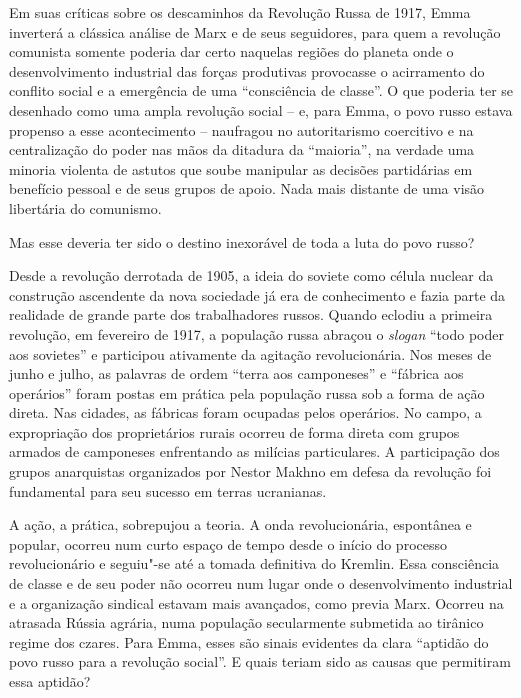 Em suas críticas sobre os descaminhos da Revolução Russa de 1917, Emma
inverterá a clássica análise de Marx e de seus seguidores, para quem a
revolução comunista somente poderia dar certo naquelas regiões do
planeta onde o desenvolvimento industrial das forças produtivas
provocasse o acirramento do conflito social e a emergência de uma
“consciência de classe”. O que poderia ter se desenhado como uma ampla
revolução social – e, para Emma, o povo russo estava propenso a esse
acontecimento – naufragou no autoritarismo coercitivo e na centralização
do poder nas mãos da ditadura da “maioria”, na verdade uma minoria
violenta de astutos que soube manipular as decisões partidárias em
benefício pessoal e de seus grupos de apoio. Nada mais distante de
uma visão libertária do comunismo. 

Mas esse deveria ter sido o destino inexorável de toda a luta do povo
russo?

Desde a revolução derrotada de 1905, a ideia do soviete como célula
nuclear da construção ascendente da nova sociedade já era de
conhecimento e fazia parte da realidade de grande parte dos
trabalhadores russos. Quando eclodiu a primeira revolução, em fevereiro
de 1917, a população russa abraçou o \textit{slogan} “todo poder aos sovietes” e
participou ativamente da agitação revolucionária. Nos meses de junho e
julho, as palavras de ordem “terra aos camponeses” e “fábrica aos
operários” foram postas em prática pela população russa sob a forma de
ação direta. Nas cidades, as fábricas foram ocupadas pelos operários.
No campo, a expropriação dos proprietários rurais ocorreu de forma
direta com grupos armados de camponeses enfrentando as milícias
particulares. A participação dos grupos anarquistas organizados por
Nestor Makhno em defesa da revolução foi fundamental para seu sucesso 
em terras ucranianas. 

A ação, a prática, sobrepujou a teoria. A onda revolucionária,
espontânea e popular, ocorreu num curto espaço de tempo desde o início
do processo revolucionário e seguiu"-se até a tomada definitiva do
Kremlin. Essa consciência de classe e de seu poder não ocorreu num
lugar onde o desenvolvimento industrial e a organização sindical estavam
mais avançados, como previa Marx. Ocorreu na atrasada Rússia agrária,
numa população secularmente submetida ao tirânico regime dos czares.
Para Emma, esses são sinais evidentes da clara “aptidão do povo russo
para a revolução social”. E quais teriam sido as causas que permitiram
essa aptidão?

